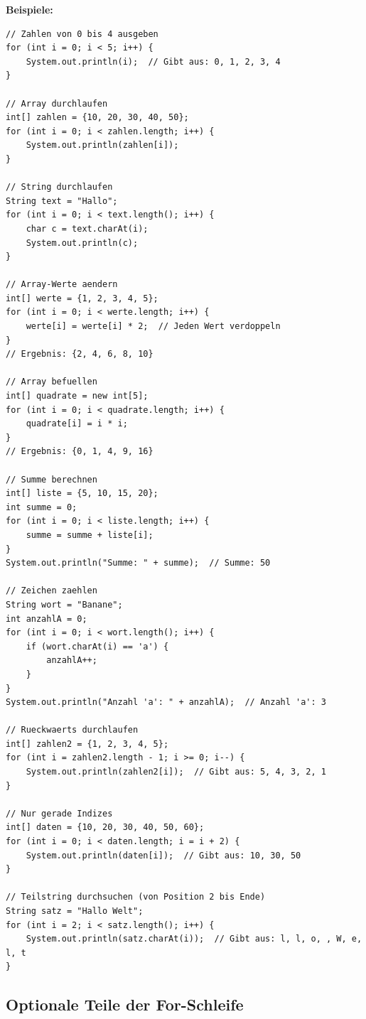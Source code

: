\textbf{Beispiele:}
\begin{lstlisting}
// Zahlen von 0 bis 4 ausgeben
for (int i = 0; i < 5; i++) {
    System.out.println(i);  // Gibt aus: 0, 1, 2, 3, 4
}

// Array durchlaufen
int[] zahlen = {10, 20, 30, 40, 50};
for (int i = 0; i < zahlen.length; i++) {
    System.out.println(zahlen[i]);
}

// String durchlaufen
String text = "Hallo";
for (int i = 0; i < text.length(); i++) {
    char c = text.charAt(i);
    System.out.println(c);
}

// Array-Werte aendern
int[] werte = {1, 2, 3, 4, 5};
for (int i = 0; i < werte.length; i++) {
    werte[i] = werte[i] * 2;  // Jeden Wert verdoppeln
}
// Ergebnis: {2, 4, 6, 8, 10}

// Array befuellen
int[] quadrate = new int[5];
for (int i = 0; i < quadrate.length; i++) {
    quadrate[i] = i * i;
}
// Ergebnis: {0, 1, 4, 9, 16}

// Summe berechnen
int[] liste = {5, 10, 15, 20};
int summe = 0;
for (int i = 0; i < liste.length; i++) {
    summe = summe + liste[i];
}
System.out.println("Summe: " + summe);  // Summe: 50

// Zeichen zaehlen
String wort = "Banane";
int anzahlA = 0;
for (int i = 0; i < wort.length(); i++) {
    if (wort.charAt(i) == 'a') {
        anzahlA++;
    }
}
System.out.println("Anzahl 'a': " + anzahlA);  // Anzahl 'a': 3

// Rueckwaerts durchlaufen
int[] zahlen2 = {1, 2, 3, 4, 5};
for (int i = zahlen2.length - 1; i >= 0; i--) {
    System.out.println(zahlen2[i]);  // Gibt aus: 5, 4, 3, 2, 1
}

// Nur gerade Indizes
int[] daten = {10, 20, 30, 40, 50, 60};
for (int i = 0; i < daten.length; i = i + 2) {
    System.out.println(daten[i]);  // Gibt aus: 10, 30, 50
}

// Teilstring durchsuchen (von Position 2 bis Ende)
String satz = "Hallo Welt";
for (int i = 2; i < satz.length(); i++) {
    System.out.println(satz.charAt(i));  // Gibt aus: l, l, o, , W, e, l, t
}
\end{lstlisting}

\newpage


\subsection*{Optionale Teile der For-Schleife}

